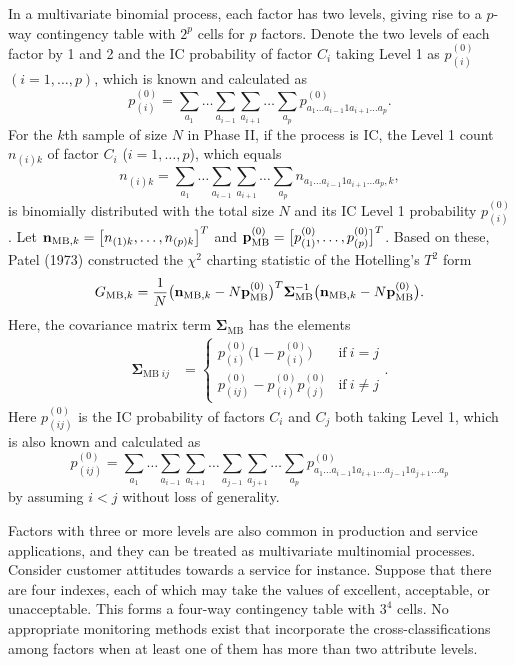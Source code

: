 In a multivariate binomial process, each factor has two levels, giving rise to a
$p$-way contingency table with $2^p$ cells for $p$ factors. Denote the two levels of
each factor by 1 and 2 and the IC probability of factor $C_i$ taking Level 1 as
$p_{(i)}^{(0)}$ $(i=1,\ldots,p)$, which is known and calculated as
\[
p_{(i)}^{(0)}=\sum_{a_1}\ldots\sum_{a_{i-1}}\sum_{a_{i+1}}\ldots
\sum_{a_p}p_{a_1\ldots a_{i-1}1a_{i+1}\ldots a_p}^{(0)}.
\]
For the $k$th sample of size $N$ in Phase II, if the process is IC, the Level 1
count $n_{(i)k}$ of factor $C_i$ ($i=1,\ldots,p$), which equals
\[
n_{(i)k}=\sum_{a_1}\ldots\sum_{a_{i-1}}\sum_{a_{i+1}}\ldots \sum_{a_p}n_{a_1\ldots
a_{i-1}1a_{i+1}\ldots a_p,k},
\]
is binomially distributed with the total size $N$ and its IC Level 1 probability
$p_{(i)}^{(0)}$. Let ${\bf n}_{\mathrm{MB},k}=\big[n_{(1)k},\ldots,n_{(p)k}\big]^T$
and ${\bf p}^{(0)}_{\mathrm{MB}}=\big[p_{(1)}^{(0)},\ldots,p_{(p)}^{(0)}\big]^T$.
Based on these, Patel (1973) constructed the $\chi^2$ charting statistic of the
Hotelling's $T^2$ form
\begin{equation}
G_{\mathrm{MB},k}=\frac{1}{N}\big({\bf n}_{\mathrm{MB},k}-N{\bf
p}^{(0)}_{\mathrm{MB}}\big)^T\bm{\Sigma}^{-1}_{\mathrm{MB}}\big({\bf
n}_{\mathrm{MB},k}-N{\bf p}^{(0)}_{\mathrm{MB}}\big).\label{F1.1}
\end{equation}
Here, the covariance matrix term $\bm{\Sigma}_{\mathrm{MB}}$ has the elements
\begin{align*}
\bm{\Sigma}_{\mathrm{MB}\;ij}&=\left\{\begin{array}{ll}p^{(0)}_{(i)}\big(1-p^{(0)}_{(i)}\big)&\textrm{if}\
i=j\\p^{(0)}_{(ij)}-p^{(0)}_{(i)}p^{(0)}_{(j)}&\textrm{if}\ i\ne
j\end{array}\right..
\end{align*}
Here $p^{(0)}_{(ij)}$ is the IC probability of factors $C_i$ and $C_j$ both taking
Level 1, which is also known and calculated as
\[
p_{(ij)}^{(0)}=\sum_{a_1}\ldots\sum_{a_{i-1}}\sum_{a_{i+1}}
\ldots\sum_{a_{j-1}}\sum_{a_{j+1}}\ldots \sum_{a_p}p_{a_1\ldots
a_{i-1}1a_{i+1}\ldots a_{j-1}1a_{j+1}\ldots a_p}^{(0)}
\]
by assuming $i<j$ without loss of generality.

Factors with three or more levels are also common in production and service
applications, and they can be treated as multivariate multinomial processes.
Consider customer attitudes towards a service for instance. Suppose that there are
four indexes, each of which may take the values of excellent, acceptable, or
unacceptable. This forms a four-way contingency table with $3^4$ cells. No
appropriate monitoring methods exist that incorporate the cross-classifications
among factors when at least one of them has more than two attribute levels.

